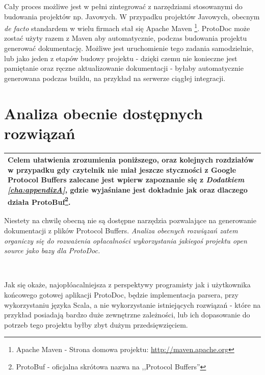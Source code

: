 \documentclass[pdflatex,11pt]{aghdpl}
\begin{document}
Cały proces możliwe jest w pełni zintegrować z narzędziami stosowanymi do budowania projektów np. Javowych. W przypadku projektów Javowych, obecnym \textit{de facto}
standardem w wielu firmach stał się Apache Maven \footnote[2]{Apache Maven - Strona domowa projektu: \href{http://maven.apache.org}{http://maven.apache.org}}.
ProtoDoc może zostać użyty razem z Maven aby automatycznie, podczas budowania projektu generować
dokumentację. Możliwe jest uruchomienie tego zadania samodzielnie, lub jako jeden z etapów budowy projektu - dzięki czemu nie konieczne jest pamiętanie oraz ręczne
aktualizowanie dokumentacji - byłaby automatycznie generowana podczas buildu, na przykład na serwerze ciągłej integracji.

\newpage

\chapter{Analiza obecnie dostępnych rozwiązań}
\label{sec:dostepneNarzedzia}


\begin{center}
  \begin{tabular}{ | p{\textwidth} |}
    \hline
      Celem ułatwienia zrozumienia poniższego, oraz kolejnych rozdziałów w przypadku gdy czytelnik nie miał 
      jeszcze styczności z Google Protocol Buffers zalecane jest wpierw
      zapoznanie się z \textit{Dodatkiem \ref{cha:appendixA}}, gdzie wyjaśniane jest dokładnie jak oraz dlaczego działa ProtoBuf\footnote[1]{ProtoBuf - oficjalna skrótowa nazwa na ,,Protocol Buffers''}. \\ \hline
  \end{tabular}
\end{center}


Niestety na chwilę obecną nie są dostępne narzędzia pozwalające na generowanie dokumentacji z plików Protocol Buffers.
\textit{Analiza obecnych rozwiązań zatem organiczy się do rozważenia opłacalności wykorzystania jakiegoś projektu open source jako bazy dla ProtoDoc.}

~\\\*

Jak się okaże, najopłóacalniejsza z perspektywy programisty jak i użytkownika końcowego gotowej aplikacji ProtoDoc, będzie implementacja parsera,
przy wykorzystaniu języka Scala, a nie wykorzystanie istniejących rozwiązań - które na przykład posiadają bardzo duże zewnętrzne zależności, lub
ich dopasowanie do potrzeb tego projektu byłby zbyt dużym przedsięwzięciem.
\end{document}
